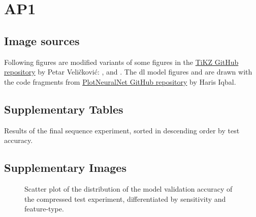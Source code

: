 \chapter{AP1}
\section{Image sources}
Following figures are modified variants of some figures in the \href{https://github.com/PetarV-/TikZ}{TiKZ GitHub repository} by Petar Veličković: ,  and .
The \gls{dl} model figures  and  are drawn with the code fragments from \href{https://github.com/HarisIqbal88/PlotNeuralNet}{PlotNeuralNet GitHub repository} by Haris Iqbal.

\clearpage
\section{Supplementary Tables}
\begin{table}[h!]
\centering

\caption{Results of the final sequence experiment, sorted in descending order by test accuracy.}
\label{tab:result_overview_scs_all}
\end{table}

\clearpage
\section{Supplementary Images}
\begin{figure}[ht!]
\centering
  \hfill
  \caption{Scatter plot of the distribution of the model validation accuracy of the compressed test experiment, differentiated by sensitivity and feature-type.}
  \label{fig:model_distribution_sct_compressed}
\end{figure}

